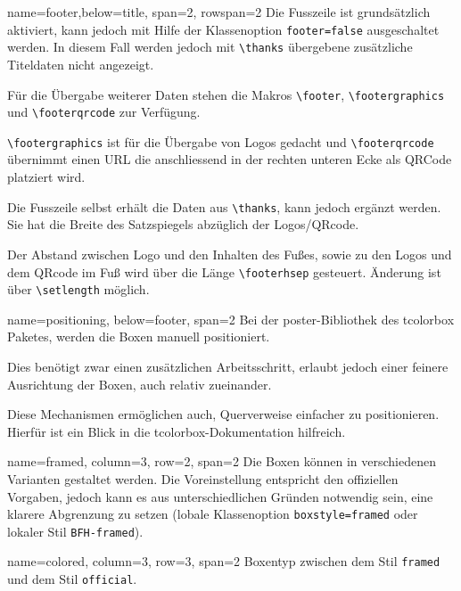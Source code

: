 \documentclass[
	paper=a0,%
	style=ruled, %
	]{bfhsciposter}
\newcommand{\tbs}{\textbackslash}
\let\code\texttt
\newcommand*{\macro}[1]{\code{\tbs#1}}
\let\pck\textsf
\begin{document}
\begin{tcbposter}[
		poster={
				columns=4,
				rows=7,
				spacing=1cm,
			},]
	\begin{posterboxenv}[title=Fusszeile]{name=footer,below=title, span=2, rowspan=2 }
		Die Fusszeile ist grundsätzlich aktiviert, kann jedoch mit Hilfe der Klassenoption \code{footer=false} ausgeschaltet werden. In diesem Fall werden jedoch mit \macro{thanks} übergebene zusätzliche Titeldaten nicht angezeigt.

		Für die Übergabe weiterer Daten stehen die Makros \macro{footer}, \macro{footergraphics} und \macro{footerqrcode} zur Verfügung.

		\macro{footergraphics} ist für die Übergabe von Logos gedacht und \macro{footerqrcode} übernimmt einen URL die anschliessend in der rechten unteren Ecke als QRCode platziert wird.

		Die Fusszeile selbst erhält die Daten aus \macro{thanks}, kann jedoch ergänzt werden. Sie hat die Breite des Satzspiegels abzüglich der Logos/QRcode.

		Der Abstand zwischen Logo und den Inhalten des Fußes, sowie zu den Logos und dem QRcode im Fuß wird über die Länge \macro{footerhsep} gesteuert. Änderung ist über \macro{setlength} möglich.
	\end{posterboxenv}

	\begin{posterboxenv}[title=Platzierung der Boxen]{name=positioning, below=footer, span=2}
		Bei der \pck{poster}-Bibliothek des \pck{tcolorbox} Paketes, werden die Boxen manuell positioniert.

		Dies benötigt zwar einen zusätzlichen Arbeitsschritt, erlaubt jedoch einer feinere Ausrichtung der Boxen, auch relativ zueinander.

		Diese Mechanismen ermöglichen auch, Querverweise einfacher zu positionieren. Hierfür ist ein Blick in die \pck{tcolorbox}-Dokumentation hilfreich.
	\end{posterboxenv}

	\begin{posterboxenv}[title=Eine Box im Stil BFH-framed, BFH-framed]{name=framed, column=3, row=2, span=2}
		Die Boxen können in verschiedenen Varianten gestaltet werden. Die Voreinstellung entspricht den offiziellen Vorgaben, jedoch kann es aus unterschiedlichen Gründen notwendig sein, eine klarere Abgrenzung zu setzen (lobale Klassenoption \code{boxstyle=framed} oder lokaler Stil \code{BFH-framed}).
	\end{posterboxenv}

	\begin{posterboxenv}[title=Eine Box im Stil BFH-colored, BFH-colored]{name=colored, column=3, row=3, span=2}
		Boxentyp zwischen dem Stil \code{framed} und dem Stil \code{official}.


\end{posterboxenv}
\end{tcbposter}
\end{document}
